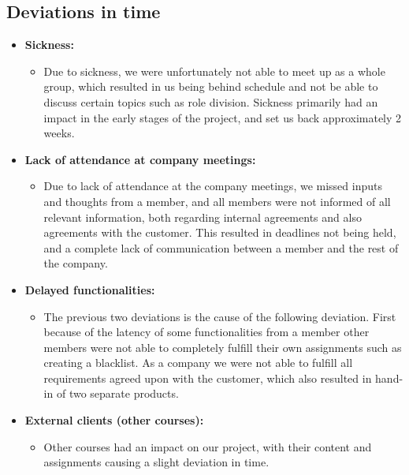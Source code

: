 \documentclass{article}
\begin{document}
\subsection*{Deviations in time}
\begin{itemize}
    \item \textbf{Sickness:}
        \begin{itemize}
            \item Due to sickness, we were unfortunately not able to meet up as a whole group, which resulted in us being behind schedule and not be able to discuss certain topics such as role division. Sickness primarily had an impact in the early stages of the project, and set us back approximately 2 weeks.
        \end{itemize}
    \item \textbf{Lack of attendance at company meetings:}
    \begin{itemize}
        \item Due to lack of attendance at the company meetings, we missed inputs and thoughts from a member, and all members were not informed of all relevant information, both regarding internal agreements and also agreements with the customer. This resulted in deadlines not being held, and a complete lack of communication between a member and the rest of the company. 
    \end{itemize}
    
    \item  \textbf{Delayed functionalities:}
    \begin{itemize}
        \item The previous two deviations is the cause of the following deviation. First because of the latency of some functionalities from a member other members were not able to completely fulfill their own assignments such as creating a blacklist. As a company we were not able to fulfill all requirements agreed upon with the customer, which also resulted in hand-in of two separate products.
    \end{itemize}
    \item \textbf{External clients (other courses):}
\begin{itemize}
    \item Other courses had an impact on our project, with their content and assignments causing a slight deviation in time. 
\end{itemize}
\end{itemize}
\end{document}
